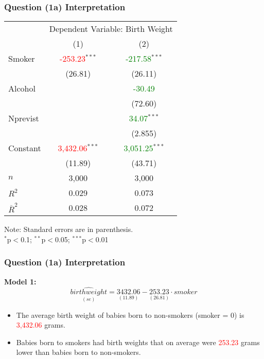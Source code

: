 \documentclass[11pt, xcolor=x11names,compress]{beamer}
\begin{document}
\begin{frame}[fragile,t]
\frametitle{Question (1a) Interpretation} 
\begin{center}
\begin{threeparttable}
\begin{tabular}{lcc}
\hline 
 & \multicolumn{2}{c}{Dependent Variable: Birth Weight} \\ 
\cline{2-3} 
 & (1) & (2)\\ 
\hline 
 Smoker & \textcolor{red}{-253.23}$^{***}$ & \textcolor{green}{-217.58}$^{***}$ \\ 
  & (26.81) & (26.11) \\ 
  Alcohol &  & \textcolor{green}{-30.49} \\ 
  &  & (72.60) \\ 
  Nprevist &  & \textcolor{green}{34.07}$^{***}$ \\ 
  &  & (2.855) \\ 
  Constant & \textcolor{red}{3,432.06}$^{***}$ & \textcolor{green}{3,051.25}$^{***}$ \\ 
  & (11.89) & (43.71) \\ 
 \hline 
$n$ & 3,000 & 3,000 \\ 
$R^{2}$ & 0.029 & 0.073 \\ 
$\overline{R}^{2}$ & 0.028 & 0.072 \\ 
\hline
\end{tabular} 
\begin{tablenotes}[flushleft]
\footnotesize
Note: Standard errors are in parenthesis.\\
$^{*}$p$<$0.1; $^{**}$p$<$0.05; $^{***}$p$<$0.01 \\
\end{tablenotes}
\end{threeparttable}
\end{center}
\end{frame}

\begin{frame}[fragile,t]
\frametitle{Question (1a) Interpretation} 
\textbf{Model 1:}
\begin{equation*}
    \underset{(se)}{\widehat{birthweight}} = \underset{(11.89)}{3432.06} - \underset{(26.81)}{253.23} \cdot smoker
\end{equation*}
\begin{itemize}
    \item The average birth weight of babies born to non-smokers (smoker = 0) is \textcolor{red}{3,432.06} grams.
    \item Babies born to smokers had birth weights that on average were \textcolor{red}{253.23} grams lower than babies born to non-smokers.
\end{itemize}
\end{frame}
\end{document}
